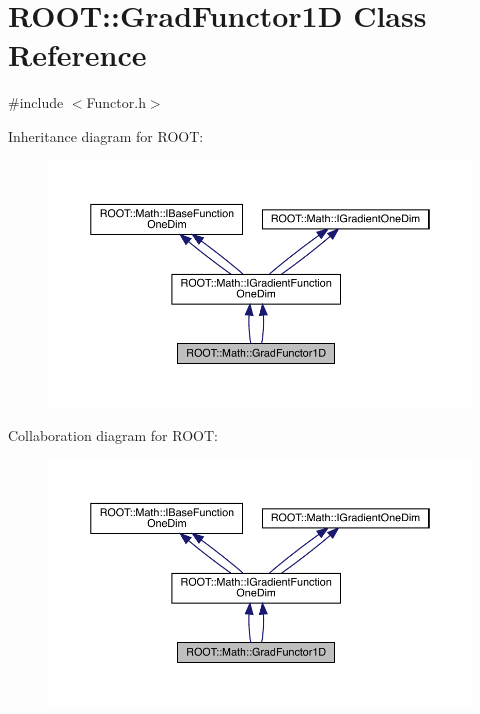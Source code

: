 \hypertarget{classROOT_1_1Math_1_1GradFunctor1D}{}\section{R\+O\+OT\+:\+:Grad\+Functor1D Class Reference}
\label{classROOT_1_1Math_1_1GradFunctor1D}


{\ttfamily \#include $<$Functor.\+h$>$}



Inheritance diagram for R\+O\+OT\+:\nopagebreak
\begin{figure}[H]
\begin{center}
\leavevmode
\includegraphics[width=350pt]{de/d0b/classROOT_1_1Math_1_1GradFunctor1D__inherit__graph}
\end{center}
\end{figure}


Collaboration diagram for R\+O\+OT\+:\nopagebreak
\begin{figure}[H]
\begin{center}
\leavevmode
\includegraphics[width=350pt]{d7/dad/classROOT_1_1Math_1_1GradFunctor1D__coll__graph}
\end{center}
\end{figure}

